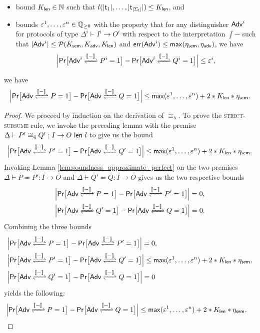 \begin{lemma}
\begin{itemize}
\item bound $K_\length \in \nat$ such that $l(|\type_1|,\ldots,|\type_{|\Sigma_\mathsf{t}|}|) \leq K_\length$, and

\item bounds $\varepsilon^1,\ldots,\varepsilon^n \in \rat_{\geq 0}$ with the property that for any distinguisher $\Adv^i$ for protocols of type $\Delta^i \vdash I^i \to O^i$ with respect to the interpretation $\int{-}$ such that $|\Adv^i| \leq \mathcal{P}(K_\sem,K_\adv,K_\length)$ and $\err(\Adv^i) \leq \max(\eta_\sem,\eta_\adv)$, we have
\[\Big|\mathsf{Pr}\big[\interaction{\Adv^i}{P^i}{\int{-}} = 1\big] - \mathsf{Pr}\big[\interaction{\Adv^i}{Q^i}{\int{-}} = 1\big]\Big| \leq \varepsilon^i,\]
\end{itemize}
we have
\[\Big|\mathsf{Pr}\big[\interaction{\Adv}{P}{\int{-}} = 1\big] - \mathsf{Pr}\big[\interaction{\Adv}{Q}{\int{-}} = 1\big]\Big| \leq \max(\varepsilon^1,\ldots,\varepsilon^n) + 2 * K_\length * \eta_\sem.\]
\end{lemma}

\begin{proof}
We proceed by induction on the derivation of $\cong_5$. To prove the \textsc{strict-subsume} rule, we invoke the preceding lemma with the premise $\Delta \vdash \lapproxcong{P'}{Q'}{I}{O}{l}{4}$ to give us the bound
\[\Big|\mathsf{Pr}\big[\interaction{\Adv}{P'}{\int{-}} = 1\big] - \mathsf{Pr}\big[\interaction{\Adv}{Q'}{\int{-}} = 1\big]\Big| \leq \max(\varepsilon^1,\ldots,\varepsilon^n) + 2 * K_\length * \eta_\sem.\]
Invoking Lemma \ref{lem:soundness_approximate_perfect} on the two premises $\Delta \vdash P = P' : I \to O$ and $\Delta \vdash Q' = Q : I \to O$ gives us the two respective bounds
\begin{align*}
& \Big|\mathsf{Pr}\big[\interaction{\Adv}{P}{\int{-}} = 1\big] - \mathsf{Pr}\big[\interaction{\Adv}{P'}{\int{-}} = 1\big]\Big| = 0, \\
& \Big|\mathsf{Pr}\big[\interaction{\Adv}{Q'}{\int{-}} = 1\big] - \mathsf{Pr}\big[\interaction{\Adv}{Q}{\int{-}} = 1\big]\Big| = 0.
\end{align*}
Combining the three bounds
\begin{align*}
& \Big|\mathsf{Pr}\big[\interaction{\Adv}{P}{\int{-}} = 1\big] - \mathsf{Pr}\big[\interaction{\Adv}{P'}{\int{-}} = 1\big]\Big| = 0, \\
&\Big|\mathsf{Pr}\big[\interaction{\Adv}{P'}{\int{-}} = 1\big] - \mathsf{Pr}\big[\interaction{\Adv}{Q'}{\int{-}} = 1\big]\Big| \leq \max(\varepsilon^1,\ldots,\varepsilon^n) + 2 * K_\length * \eta_\sem, \\
& \Big|\mathsf{Pr}\big[\interaction{\Adv}{Q'}{\int{-}} = 1\big] - \mathsf{Pr}\big[\interaction{\Adv}{Q}{\int{-}} = 1\big]\Big| = 0
\end{align*}
yields the following:
\begin{align*}
& \Big|\mathsf{Pr}\big[\interaction{\Adv}{P}{\int{-}} = 1\big] - \mathsf{Pr}\big[\interaction{\Adv}{Q}{\int{-}} = 1\big]\Big| \leq \max(\varepsilon^1,\ldots,\varepsilon^n) + 2 * K_\length * \eta_\sem.
\end{align*}
\end{proof}

